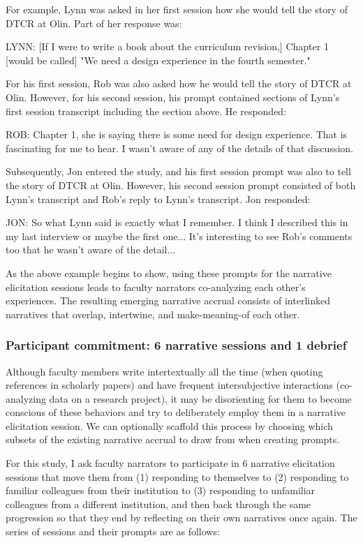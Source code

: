 For example, Lynn was asked in her first session how she would tell the story of DTCR at Olin. Part of her response was:

LYNN: [If I were to write a book about the curriculum revision,] Chapter 1 [would be called] "We need a design experience in the fourth semester."

For his first session, Rob was also asked how he would tell the story of DTCR at Olin. However, for his second session, his prompt contained sections of Lynn’s first session transcript including the section above. He responded:

ROB: Chapter 1, she is saying there is some need for design experience. That is fascinating for me to hear. I wasn’t aware of any of the details of that discussion.

Subsequently, Jon entered the study, and his first session prompt was also to tell the story of DTCR at Olin. However, his second session prompt consisted of both Lynn’s transcript and Rob’s reply to Lynn’s transcript. Jon responded:

JON: So what Lynn said is exactly what I remember. I think I described this in my last interview or maybe the first one... It’s interesting to see Rob’s comments too that he wasn’t aware of the detail...

As the above example begins to show, using these prompts for the narrative elicitation sessions leads to faculty narrators co-analyzing each other's experiences. The resulting emerging narrative accrual consists of interlinked narratives that overlap, intertwine, and make-meaning-of each other.

\subsubsection{Participant commitment: 6 narrative sessions and 1 debrief}

Although faculty members write intertextually all the time (when quoting references in scholarly papers) and have frequent intersubjective interactions (co-analyzing data on a research project), it may be disorienting for them to become conscious of these behaviors and try to deliberately employ them in a narrative elicitation session. We can optionally scaffold this process by choosing which subsets of the existing narrative accrual to draw from when creating prompts.

For this study, I ask faculty narrators to participate in 6 narrative elicitation sessions that move them from (1) responding to themselves to (2) responding to familiar colleagues from their institution to (3) responding to unfamiliar colleagues from a different institution, and then back through the same progression so that they end by reflecting on their own narratives once again. The series of sessions and their prompts are as follows:

